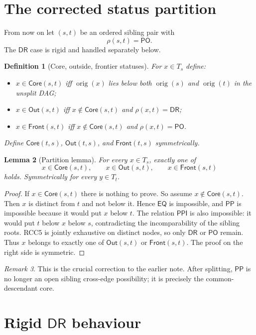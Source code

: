 \documentclass[11pt]{article}
\newtheorem{definition}{Definition}[section]
\newtheorem{lemma}[definition]{Lemma}
\theoremstyle{remark}
\newtheorem{remark}[definition]{Remark}
\newcommand{\DR}{\mathsf{DR}}
\newcommand{\PO}{\mathsf{PO}}
\newcommand{\PP}{\mathsf{PP}}
\newcommand{\PPI}{\mathsf{PPI}}
\newcommand{\EQ}{\mathsf{EQ}}
\newcommand{\orig}{\operatorname{orig}}
\newcommand{\Core}{\mathsf{Core}}
\newcommand{\Out}{\mathsf{Out}}
\newcommand{\Front}{\mathsf{Front}}
\begin{document}
\section{The corrected status partition}

From now on let $(s,t)$ be an ordered sibling pair with
\[
\rho(s,t)=\PO.
\]
The $\DR$ case is rigid and handled separately below.

\begin{definition}[Core, outside, frontier statuses]\label{def:statuses-completed}
For $x\in T_s$ define:
\begin{itemize}
    \item $x\in \Core(s,t)$ iff $\orig(x)$ lies below both $\orig(s)$ and $\orig(t)$ in the unsplit DAG;
    \item $x\in \Out(s,t)$ iff $x\notin \Core(s,t)$ and $\rho(x,t)=\DR$;
    \item $x\in \Front(s,t)$ iff $x\notin \Core(s,t)$ and $\rho(x,t)=\PO$.
\end{itemize}
Define $\Core(t,s)$, $\Out(t,s)$, and $\Front(t,s)$ symmetrically.
\end{definition}

\begin{lemma}[Partition lemma]\label{lem:partition-completed}
For every $x\in T_s$, exactly one of
\[
 x\in \Core(s,t),\qquad x\in \Out(s,t),\qquad x\in \Front(s,t)
\]
holds. Symmetrically for every $y\in T_t$.
\end{lemma}

\begin{proof}
If $x\in \Core(s,t)$ there is nothing to prove. So assume $x\notin \Core(s,t)$. Then $x$ is distinct from $t$ and not below it. Hence $\EQ$ is impossible, and $\PP$ is impossible because it would put $x$ below $t$. The relation $\PPI$ is also impossible: it would put $t$ below $x$ below $s$, contradicting the incomparability of the sibling roots. RCC5 is jointly exhaustive on distinct nodes, so only $\DR$ or $\PO$ remain. Thus $x$ belongs to exactly one of $\Out(s,t)$ or $\Front(s,t)$. The proof on the right side is symmetric.
\end{proof}

\begin{remark}
This is the crucial correction to the earlier note. After splitting, $\PP$ is no longer an open sibling cross-edge possibility; it is precisely the common-descendant core.
\end{remark}

\section{Rigid $\DR$ behaviour}
\end{document}
